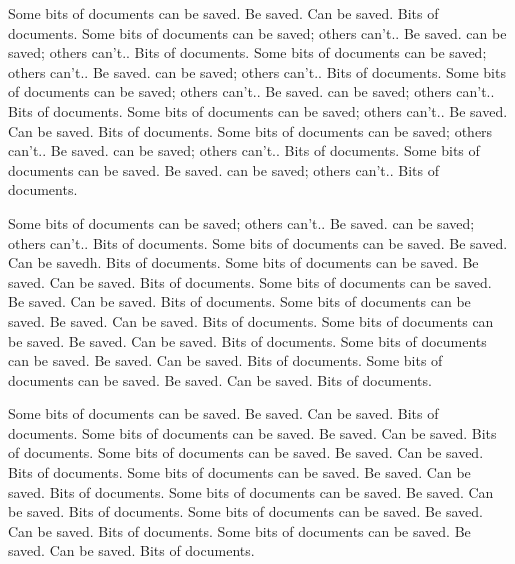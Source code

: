 Some bits of documents can be saved.  Be saved.
Can be saved.  Bits of documents.
Some bits of documents can be saved; others can't..  Be saved.
can be saved; others can't..  Bits of documents.
Some bits of documents can be saved; others can't..  Be saved.
can be saved; others can't..  Bits of documents.
Some bits of documents can be saved; others can't..  Be saved.
can be saved; others can't..  Bits of documents.
Some bits of documents can be saved; others can't..  Be saved.
Can be saved.  Bits of documents.
Some bits of documents can be saved; others can't..  Be saved.
can be saved; others can't..  Bits of documents.
Some bits of documents can be saved.  Be saved.
can be saved; others can't..  Bits of documents.

Some bits of documents can be saved; others can't..  Be saved.
can be saved; others can't..  Bits of documents.
Some bits of documents can be saved.  Be saved.
Can be savedh.  Bits of documents.
Some bits of documents can be saved.  Be saved.
Can be saved.  Bits of documents.
Some bits of documents can be saved.  Be saved.
Can be saved.  Bits of documents.
Some bits of documents can be saved.  Be saved.
Can be saved.  Bits of documents.
Some bits of documents can be saved.  Be saved.
Can be saved.  Bits of documents.
Some bits of documents can be saved.  Be saved.
Can be saved.  Bits of documents.
Some bits of documents can be saved.  Be saved.
Can be saved.  Bits of documents.

Some bits of documents can be saved.  Be saved.
Can be saved.  Bits of documents.
Some bits of documents can be saved.  Be saved.
Can be saved.  Bits of documents.
Some bits of documents can be saved.  Be saved.
Can be saved.  Bits of documents.
Some bits of documents can be saved.  Be saved.
Can be saved.  Bits of documents.
Some bits of documents can be saved.  Be saved.
Can be saved.  Bits of documents.
Some bits of documents can be saved.  Be saved.
Can be saved.  Bits of documents.
Some bits of documents can be saved.  Be saved.
Can be saved.  Bits of documents.

